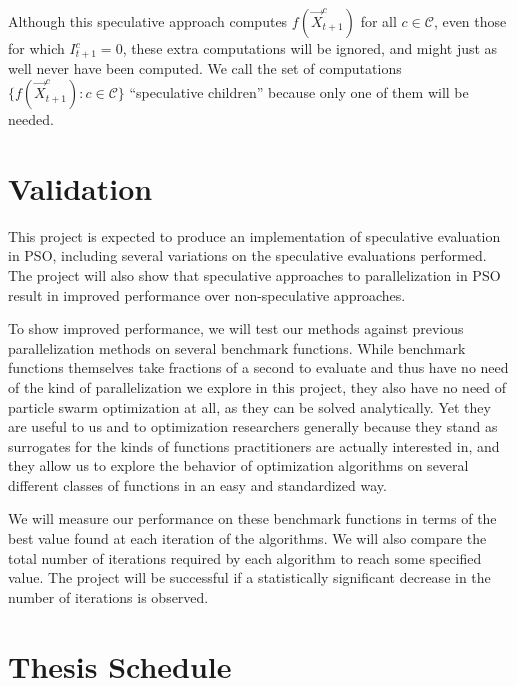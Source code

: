 \documentclass[ms]{byuprop}
\providecommand{\ofunc}{\ensuremath{f}}
\providecommand{\indic}{\ensuremath{I}}
\providecommand{\specpos}{\ensuremath{\vec{X}}}
\providecommand{\caseset}{\ensuremath{\mathcal{C}}}
\providecommand{\casegen}{\ensuremath{c}}
\begin{document}
Although this speculative approach computes $\ofunc(\specpos_{t+1}^{\casegen})$
for all $\casegen \in \caseset$, even those for which $\indic_{t+1}^{\casegen}
= 0$, these extra computations will be ignored, and might just as well never
have been computed.  We call the set of computations
$\{\ofunc(\specpos_{t+1}^{c}) : \casegen \in \caseset\}$ ``speculative
children'' because only one of them will be needed.

\section{Validation}

This project is expected to produce an implementation of speculative evaluation
in PSO, including several variations on the speculative evaluations performed.
The project will also show that speculative approaches to parallelization in
PSO result in improved performance over non-speculative approaches.

To show improved performance, we will test our methods against previous
parallelization methods on several benchmark functions.  While benchmark
functions themselves take fractions of a second to evaluate and thus have no
need of the kind of parallelization we explore in this project, they also have
no need of particle swarm optimization at all, as they can be solved
analytically.  Yet they are useful to us and to optimization researchers
generally because they stand as surrogates for the kinds of functions
practitioners are actually interested in, and they allow us to explore the
behavior of optimization algorithms on several different classes of functions
in an easy and standardized way.

We will measure our performance on these benchmark functions in terms of the
best value found at each iteration of the algorithms.  We will also compare the
total number of iterations required by each algorithm to reach some specified
value.  The project will be successful if a statistically significant decrease
in the number of iterations is observed.

\section{Thesis Schedule}
\end{document}
